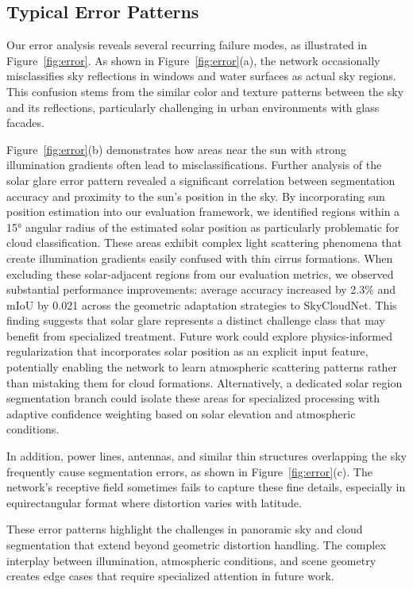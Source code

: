 \documentclass[conference]{IEEEtran}
\begin{document}
\subsection{Typical Error Patterns}

Our error analysis reveals several recurring failure modes, as illustrated in Figure~\ref{fig:error}. 
As shown in Figure~\ref{fig:error}(a), the network occasionally misclassifies sky reflections in windows and water surfaces as actual sky regions. 
This confusion stems from the similar color and texture patterns between the sky and its reflections, particularly challenging in urban environments with glass facades.

Figure~\ref{fig:error}(b) demonstrates how areas near the sun with strong illumination gradients often lead to misclassifications. Further analysis of the solar glare error pattern revealed a significant correlation between segmentation accuracy and proximity to the sun's position in the sky. By incorporating sun position estimation into our evaluation framework, we identified regions within a 15° angular radius of the estimated solar position as particularly problematic for cloud classification. These areas exhibit complex light scattering phenomena that create illumination gradients easily confused with thin cirrus formations. When excluding these solar-adjacent regions from our evaluation metrics, we observed substantial performance improvements: average accuracy increased by 2.3\% and mIoU by 0.021 across the geometric adaptation strategies to SkyCloudNet. 
This finding suggests that solar glare represents a distinct challenge class that may benefit from specialized treatment. 
Future work could explore physics-informed regularization that incorporates solar position as an explicit input feature, potentially enabling the network to learn atmospheric scattering patterns rather than mistaking them for cloud formations. 
Alternatively, a dedicated solar region segmentation branch could isolate these areas for specialized processing with adaptive confidence weighting based on solar elevation and atmospheric conditions.

In addition, power lines, antennas, and similar thin structures overlapping the sky frequently cause segmentation errors, as shown in Figure~\ref{fig:error}(c). The network's receptive field sometimes fails to capture these fine details, especially in equirectangular format where distortion varies with latitude.

These error patterns highlight the challenges in panoramic sky and cloud segmentation that extend beyond geometric distortion handling. The complex interplay between illumination, atmospheric conditions, and scene geometry creates edge cases that require specialized attention in future work.
\end{document}
